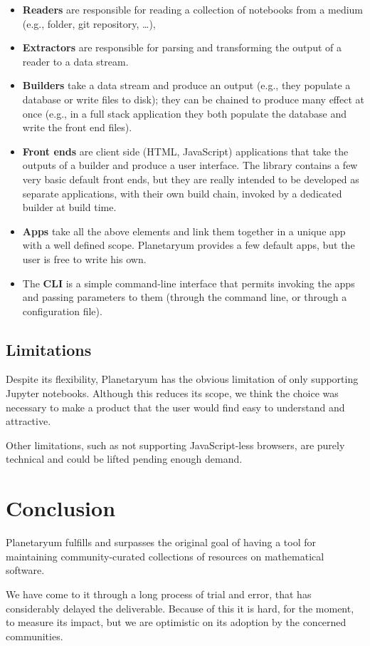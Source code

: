 \begin{itemize}
\item
  \textbf{Readers} are responsible for reading a collection of notebooks
  from a medium (e.g., folder, git repository, \ldots{}),
\item
  \textbf{Extractors} are responsible for parsing and transforming the
  output of a reader to a data stream.
\item
  \textbf{Builders} take a data stream and produce an output (e.g., they
  populate a database or write files to disk); they can be chained to
  produce many effect at once (e.g., in a full stack application they
  both populate the database and write the front end files).
\item
  \textbf{Front ends} are client side (HTML, JavaScript) applications
  that take the outputs of a builder and produce a user interface. The
  library contains a few very basic default front ends, but they are
  really intended to be developed as separate applications, with their
  own build chain, invoked by a dedicated builder at build time.
\item
  \textbf{Apps} take all the above elements and link them together in a
  unique app with a well defined scope. Planetaryum provides a few
  default apps, but the user is free to write his own.
\item
  The \textbf{CLI} is a simple command-line interface that permits
  invoking the apps and passing parameters to them (through the command
  line, or through a configuration file).
\end{itemize}

\subsection{Limitations}\label{limitations}

Despite its flexibility, Planetaryum has the obvious limitation of only
supporting Jupyter notebooks. Although this reduces its scope, we think
the choice was necessary to make a product that the user would find easy
to understand and attractive.

Other limitations, such as not supporting JavaScript-less browsers, are
purely technical and could be lifted pending enough demand.

\section{Conclusion}\label{conclusion}

Planetaryum fulfills and surpasses the original goal of having a tool
for maintaining community-curated collections of resources on
mathematical software.

We have come to it through a long process of trial and error, that has
considerably delayed the deliverable. Because of this it is hard, for
the moment, to measure its impact, but we are optimistic on its adoption
by the concerned communities.
